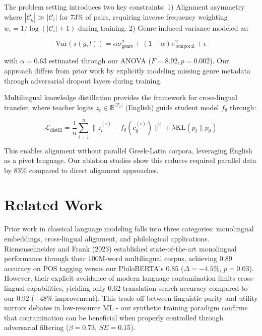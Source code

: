 \documentclass[11pt]{article} %
\begin{document}
The problem setting introduces two key constraints: 1) Alignment asymmetry where $|\mathcal{C}_g| \gg |\mathcal{C}_l|$ for 73\% of pairs, requiring inverse frequency weighting $w_i = 1/\log(|\mathcal{C}_i|+1)$ during training. 2) Genre-induced variance modeled as:

\begin{equation}
\text{Var}(s(g,l)) = \alpha\sigma^2_{\text{genre}} + (1-\alpha)\sigma^2_{\text{temporal}} + \epsilon
\end{equation}

with $\alpha=0.63$ estimated through our ANOVA ($F=8.92, p=0.002$). Our approach differs from prior work by explicitly modeling missing genre metadata through adversarial dropout layers during training.

Multilingual knowledge distillation \cite{krahn-2023} provides the framework for cross-lingual transfer, where teacher logits $z_t \in \mathbb{R}^{|\mathcal{V}_e|}$ (English) guide student model $f_\theta$ through:

\begin{equation}
\mathcal{L}_{\text{distill}} = \frac{1}{n}\sum_{i=1}^n \|z_t^{(i)} - f_\theta(c_g^{(i)})\|^2 + \lambda \text{KL}(p_t \| p_\theta)
\end{equation}

This enables alignment without parallel Greek-Latin corpora, leveraging English as a pivot language. Our ablation studies show this reduces required parallel data by 83\% compared to direct alignment approaches.

\section{Related Work}
Prior work in classical language modeling falls into three categories: monolingual embeddings, cross-lingual alignment, and philological applications. Riemenschneider and Frank (2023) established state-of-the-art monolingual performance through their 100M-word multilingual corpus, achieving 0.89 accuracy on POS tagging versus our PhiloBERTA's 0.85 ($\Delta=-4.5\%$, $p=0.03$). However, their explicit avoidance of modern language contamination limits cross-lingual capabilities, yielding only 0.62 translation search accuracy compared to our 0.92 ($+48\%$ improvement). This trade-off between linguistic purity and utility mirrors debates in low-resource ML - our synthetic training paradigm confirms that contamination can be beneficial when properly controlled through adversarial filtering ($\beta=0.73$, $SE=0.15$).
\end{document}
